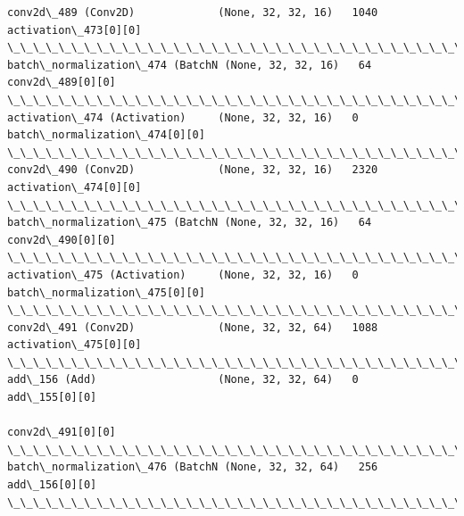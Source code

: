 \documentclass[11pt]{article}
\begin{document}
\begin{Verbatim}[commandchars=\\\{\}]
conv2d\_489 (Conv2D)             (None, 32, 32, 16)   1040        activation\_473[0][0]             
\_\_\_\_\_\_\_\_\_\_\_\_\_\_\_\_\_\_\_\_\_\_\_\_\_\_\_\_\_\_\_\_\_\_\_\_\_\_\_\_\_\_\_\_\_\_\_\_\_\_\_\_\_\_\_\_\_\_\_\_\_\_\_\_\_\_\_\_\_\_\_\_\_\_\_\_\_\_\_\_\_\_\_\_\_\_\_\_\_\_\_\_\_\_\_\_\_\_
batch\_normalization\_474 (BatchN (None, 32, 32, 16)   64          conv2d\_489[0][0]                 
\_\_\_\_\_\_\_\_\_\_\_\_\_\_\_\_\_\_\_\_\_\_\_\_\_\_\_\_\_\_\_\_\_\_\_\_\_\_\_\_\_\_\_\_\_\_\_\_\_\_\_\_\_\_\_\_\_\_\_\_\_\_\_\_\_\_\_\_\_\_\_\_\_\_\_\_\_\_\_\_\_\_\_\_\_\_\_\_\_\_\_\_\_\_\_\_\_\_
activation\_474 (Activation)     (None, 32, 32, 16)   0           batch\_normalization\_474[0][0]    
\_\_\_\_\_\_\_\_\_\_\_\_\_\_\_\_\_\_\_\_\_\_\_\_\_\_\_\_\_\_\_\_\_\_\_\_\_\_\_\_\_\_\_\_\_\_\_\_\_\_\_\_\_\_\_\_\_\_\_\_\_\_\_\_\_\_\_\_\_\_\_\_\_\_\_\_\_\_\_\_\_\_\_\_\_\_\_\_\_\_\_\_\_\_\_\_\_\_
conv2d\_490 (Conv2D)             (None, 32, 32, 16)   2320        activation\_474[0][0]             
\_\_\_\_\_\_\_\_\_\_\_\_\_\_\_\_\_\_\_\_\_\_\_\_\_\_\_\_\_\_\_\_\_\_\_\_\_\_\_\_\_\_\_\_\_\_\_\_\_\_\_\_\_\_\_\_\_\_\_\_\_\_\_\_\_\_\_\_\_\_\_\_\_\_\_\_\_\_\_\_\_\_\_\_\_\_\_\_\_\_\_\_\_\_\_\_\_\_
batch\_normalization\_475 (BatchN (None, 32, 32, 16)   64          conv2d\_490[0][0]                 
\_\_\_\_\_\_\_\_\_\_\_\_\_\_\_\_\_\_\_\_\_\_\_\_\_\_\_\_\_\_\_\_\_\_\_\_\_\_\_\_\_\_\_\_\_\_\_\_\_\_\_\_\_\_\_\_\_\_\_\_\_\_\_\_\_\_\_\_\_\_\_\_\_\_\_\_\_\_\_\_\_\_\_\_\_\_\_\_\_\_\_\_\_\_\_\_\_\_
activation\_475 (Activation)     (None, 32, 32, 16)   0           batch\_normalization\_475[0][0]    
\_\_\_\_\_\_\_\_\_\_\_\_\_\_\_\_\_\_\_\_\_\_\_\_\_\_\_\_\_\_\_\_\_\_\_\_\_\_\_\_\_\_\_\_\_\_\_\_\_\_\_\_\_\_\_\_\_\_\_\_\_\_\_\_\_\_\_\_\_\_\_\_\_\_\_\_\_\_\_\_\_\_\_\_\_\_\_\_\_\_\_\_\_\_\_\_\_\_
conv2d\_491 (Conv2D)             (None, 32, 32, 64)   1088        activation\_475[0][0]             
\_\_\_\_\_\_\_\_\_\_\_\_\_\_\_\_\_\_\_\_\_\_\_\_\_\_\_\_\_\_\_\_\_\_\_\_\_\_\_\_\_\_\_\_\_\_\_\_\_\_\_\_\_\_\_\_\_\_\_\_\_\_\_\_\_\_\_\_\_\_\_\_\_\_\_\_\_\_\_\_\_\_\_\_\_\_\_\_\_\_\_\_\_\_\_\_\_\_
add\_156 (Add)                   (None, 32, 32, 64)   0           add\_155[0][0]                    
                                                                 conv2d\_491[0][0]                 
\_\_\_\_\_\_\_\_\_\_\_\_\_\_\_\_\_\_\_\_\_\_\_\_\_\_\_\_\_\_\_\_\_\_\_\_\_\_\_\_\_\_\_\_\_\_\_\_\_\_\_\_\_\_\_\_\_\_\_\_\_\_\_\_\_\_\_\_\_\_\_\_\_\_\_\_\_\_\_\_\_\_\_\_\_\_\_\_\_\_\_\_\_\_\_\_\_\_
batch\_normalization\_476 (BatchN (None, 32, 32, 64)   256         add\_156[0][0]                    
\_\_\_\_\_\_\_\_\_\_\_\_\_\_\_\_\_\_\_\_\_\_\_\_\_\_\_\_\_\_\_\_\_\_\_\_\_\_\_\_\_\_\_\_\_\_\_\_\_\_\_\_\_\_\_\_\_\_\_\_\_\_\_\_\_\_\_\_\_\_\_\_\_\_\_\_\_\_\_\_\_\_\_\_\_\_\_\_\_\_\_\_\_\_\_\_\_\_

\end{Verbatim}
\end{document}
